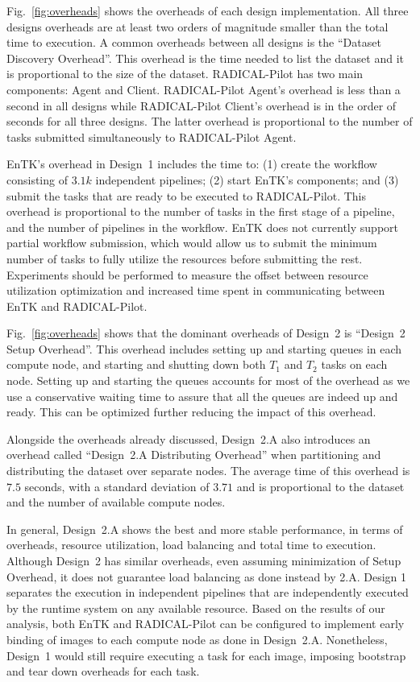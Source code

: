Fig.~\ref{fig:overheads} shows the overheads of each design implementation.
All three designs overheads are at least two orders of magnitude smaller than
the total time to execution. A common overheads between all designs is the
``Dataset Discovery Overhead''. This overhead is the time needed to list the
dataset and it is proportional to the size of the dataset. RADICAL-Pilot has
two main components: Agent and Client. RADICAL-Pilot Agent's overhead is less
than a second in all designs while RADICAL-Pilot Client's overhead is in the
order of seconds for all three designs. The latter overhead is proportional
to the number of tasks submitted simultaneously to RADICAL-Pilot Agent.

EnTK's overhead in Design~1 includes the time to: (1) create the workflow
consisting of $3.1k$ independent pipelines; (2) start EnTK's components; and
(3) submit the tasks that are ready to be executed to RADICAL-Pilot. This
overhead is proportional to the number of tasks in the first stage of a
pipeline, and the number of pipelines in the workflow. EnTK does not
currently support partial workflow submission, which would allow us to submit
the minimum number of tasks to fully utilize the resources before submitting
the rest. Experiments should be performed to measure the offset between
resource utilization optimization and increased time spent in communicating
between EnTK and RADICAL-Pilot.

Fig.~\ref{fig:overheads} shows that the dominant overheads of Design~2 is
``Design~2 Setup Overhead''. This overhead includes setting up and starting
queues in each compute node, and starting and shutting down both $T_{1}$ and
$T_{2}$ tasks on each node. Setting up and starting the queues accounts for
most of the overhead as we use a conservative waiting time to assure that all
the queues are indeed up and ready. This can be optimized further reducing
the impact of this overhead.

Alongside the overheads already discussed, Design~2.A also introduces an
overhead called ``Design~2.A Distributing Overhead'' when partitioning and
distributing the dataset over separate nodes. The average time of this
overhead is $7.5$ seconds, with a standard deviation of $3.71$ and is
proportional to the dataset and the number of available compute nodes.

In general, Design~2.A shows the best and more stable performance, in terms
of overheads, resource utilization, load balancing and total time to
execution. Although Design~2 has similar overheads, even assuming
minimization of Setup Overhead, it does not guarantee load balancing as done
instead by 2.A. Design 1 separates the execution in independent pipelines
that are independently executed by the runtime system on any available
resource. Based on the results of our analysis, both EnTK and RADICAL-Pilot
can be configured to implement early binding of images to each compute node
as done in Design~2.A. Nonetheless, Design~1 would still require executing a
task for each image, imposing bootstrap and tear down overheads for each
task.


